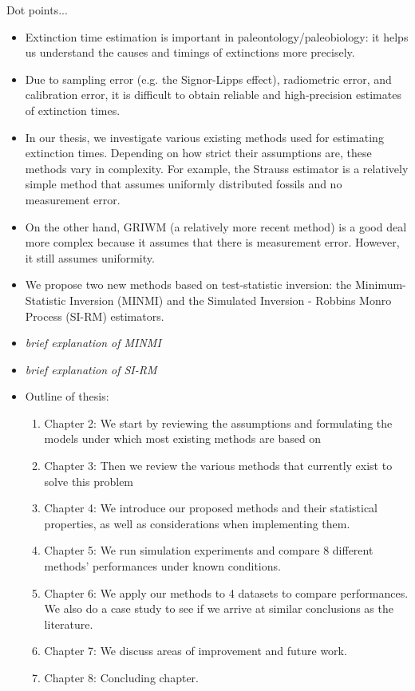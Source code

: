 
Dot points...
\begin{itemize}
    \item Extinction time estimation is important in paleontology/paleobiology: it helps us understand the causes and timings of extinctions more precisely.
    \item Due to sampling error (e.g. the Signor-Lipps effect), radiometric error, and calibration error, it is difficult to obtain reliable and high-precision estimates of extinction times.
    \item In our thesis, we investigate various existing methods used for estimating extinction times. Depending on how strict their assumptions are, these methods vary in complexity. For example, the Strauss estimator is a relatively simple method that assumes uniformly distributed fossils and no measurement error.
    \item On the other hand, GRIWM (a relatively more recent method) is a good deal more complex because it assumes that there is measurement error. However, it still assumes uniformity.
    \item We propose two new methods based on test-statistic inversion: the Minimum-Statistic Inversion (MINMI) and the Simulated Inversion - Robbins Monro Process (SI-RM) estimators.
    \item \textit{brief explanation of MINMI}
    \item \textit{brief explanation of SI-RM}
    \item Outline of thesis:
    \begin{enumerate}
        \item Chapter 2: We start by reviewing the assumptions and formulating the models under which most existing methods are based on
        \item Chapter 3: Then we review the various methods that currently exist to solve this problem
        \item Chapter 4: We introduce our proposed methods and their statistical properties, as well as considerations when implementing them.
        \item Chapter 5: We run simulation experiments and compare 8 different methods' performances under known conditions.
        \item Chapter 6: We apply our methods to 4 datasets to compare performances. We also do a case study to see if we arrive at similar conclusions as the literature.
        \item Chapter 7: We discuss areas of improvement and future work.
        \item Chapter 8: Concluding chapter.
    \end{enumerate}
\end{itemize}

